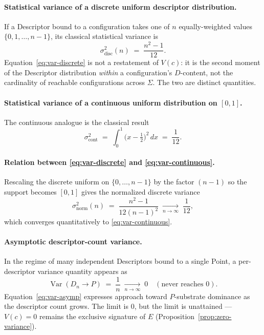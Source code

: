 \documentclass[11pt,a4paper]{article}
\theoremstyle{definition}
\theoremstyle{remark}
\begin{document}
\paragraph{Statistical variance of a discrete uniform descriptor distribution.}
If a Descriptor bound to a configuration takes one of $n$ equally-weighted values $\{0,1,\ldots,n-1\}$, its classical statistical variance is
\begin{equation}\label{eq:var-discrete}
\sigma^{2}_{\text{disc}}(n) \;=\; \frac{n^{2}-1}{12}.
\end{equation}
Equation~\eqref{eq:var-discrete} is not a restatement of $V(c)$: it is the second moment of the Descriptor distribution \emph{within} a configuration's $D$-content, not the cardinality of reachable configurations across $\Sigma$. The two are distinct quantities.

\paragraph{Statistical variance of a continuous uniform distribution on $[0,1]$.}
The continuous analogue is the classical result
\begin{equation}\label{eq:var-continuous}
\sigma^{2}_{\text{cont}} \;=\; \int_{0}^{1}\!\bigl(x-\tfrac{1}{2}\bigr)^{2}\,dx \;=\; \frac{1}{12}.
\end{equation}

\paragraph{Relation between \eqref{eq:var-discrete} and \eqref{eq:var-continuous}.}
Rescaling the discrete uniform on $\{0,\ldots,n-1\}$ by the factor $(n-1)$ so the support becomes $[0,1]$ gives the normalized discrete variance
\begin{equation}\label{eq:var-norm}
\sigma^{2}_{\text{norm}}(n) \;=\; \frac{n^{2}-1}{12(n-1)^{2}} \;\xrightarrow[n\to\infty]{}\; \frac{1}{12},
\end{equation}
which converges quantitatively to \eqref{eq:var-continuous}.

\paragraph{Asymptotic descriptor-count variance.}
In the regime of many independent Descriptors bound to a single Point, a per-descriptor variance quantity appears as
\begin{equation}\label{eq:var-asymp}
\operatorname{Var}(D_{n}\to P) \;=\; \frac{1}{n} \;\xrightarrow[n\to\infty]{}\; 0 \quad (\text{never reaches } 0).
\end{equation}
Equation~\eqref{eq:var-asymp} expresses approach toward $P$-substrate dominance as the descriptor count grows. The limit is $0$, but the limit is unattained --- $V(c)=0$ remains the exclusive signature of $E$ (Proposition~\ref{prop:zero-variance}).
\end{document}
